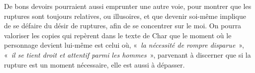 {De bons devoirs pourraient aussi emprunter une autre voie, pour montrer que
les ruptures sont toujours relatives, ou illusoires, et que devenir soi-même implique de
se défaire du désir de ruptures, afin de se concentrer sur le moi. On pourra valoriser
les copies qui repèrent dans le texte de Char que le moment où le personnage devient
lui-même est celui où, «~\emph{la nécessité de rompre disparue}~», «~\emph{il se tient droit et attentif parmi les hommes}~», parvenant à discerner que si la rupture est un moment
nécessaire, elle est aussi à dépasser.}%

